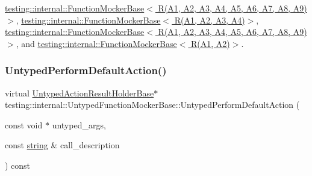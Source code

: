\hyperlink{classtesting_1_1internal_1_1_function_mocker_base_aebdb11fe4ea9e9f3984cbcd58c6f6cf9}{testing\+::internal\+::\+Function\+Mocker\+Base$<$ R(\+A1, A2, A3, A4, A5, A6, A7, A8, A9)$>$}, \hyperlink{classtesting_1_1internal_1_1_function_mocker_base_aebdb11fe4ea9e9f3984cbcd58c6f6cf9}{testing\+::internal\+::\+Function\+Mocker\+Base$<$ R(\+A1, A2, A3, A4)$>$}, \hyperlink{classtesting_1_1internal_1_1_function_mocker_base_aebdb11fe4ea9e9f3984cbcd58c6f6cf9}{testing\+::internal\+::\+Function\+Mocker\+Base$<$ R(\+A1, A2, A3, A4, A5, A6, A7, A8, A9) $>$}, and \hyperlink{classtesting_1_1internal_1_1_function_mocker_base_aebdb11fe4ea9e9f3984cbcd58c6f6cf9}{testing\+::internal\+::\+Function\+Mocker\+Base$<$ R(\+A1, A2)$>$}.

\mbox{\label{classtesting_1_1internal_1_1_untyped_function_mocker_base_a2cb149456cd559d5b0615f2310b235e3}} 
\subsubsection{\texorpdfstring{Untyped\+Perform\+Default\+Action()}{UntypedPerformDefaultAction()}}
{\footnotesize\ttfamily virtual \hyperlink{classtesting_1_1internal_1_1_untyped_action_result_holder_base}{Untyped\+Action\+Result\+Holder\+Base}$\ast$ testing\+::internal\+::\+Untyped\+Function\+Mocker\+Base\+::\+Untyped\+Perform\+Default\+Action (\begin{DoxyParamCaption}\item[{const void $\ast$}]{untyped\+\_\+args,  }\item[{const \hyperlink{namespacetesting_1_1internal_a8e8ff5b11e64078831112677156cb111}{string} \&}]{call\+\_\+description }\end{DoxyParamCaption}) const\hspace{0.3cm}{\ttfamily [pure virtual]}}



